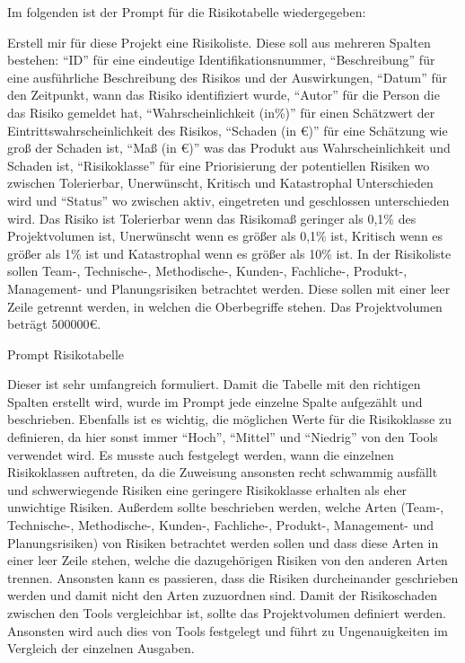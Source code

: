Im folgenden ist der Prompt für die Risikotabelle wiedergegeben:

\begin{prompt}[H]
    \begin{tcolorbox}[colback=gray!20, colframe=gray!20, boxrule=0pt, sharp corners] 
        Erstell mir für diese Projekt eine Risikoliste. Diese soll aus mehreren Spalten bestehen: ``ID'' für eine 
        eindeutige Identifikationsnummer, ``Beschreibung'' für eine ausführliche Beschreibung des Risikos und der 
        Auswirkungen, ``Datum'' für den Zeitpunkt, wann das Risiko identifiziert wurde, ``Autor'' für die Person die 
        das Risiko gemeldet hat, ``Wahrscheinlichkeit (in\%)'' für einen Schätzwert der Eintrittswahrscheinlichkeit 
        des Risikos, ``Schaden (in €)'' für eine Schätzung wie groß der Schaden ist, ``Maß (in €)'' was das Produkt aus 
        Wahrscheinlichkeit und Schaden ist, ``Risikoklasse'' für eine Priorisierung der potentiellen Risiken wo 
        zwischen Tolerierbar, Unerwünscht, Kritisch und Katastrophal Unterschieden wird und ``Status'' wo zwischen 
        aktiv, eingetreten und geschlossen unterschieden wird. Das Risiko ist Tolerierbar wenn das Risikomaß geringer 
        als 0,1\% des Projektvolumen ist, Unerwünscht wenn es größer als 0,1\% ist, Kritisch wenn es größer als 1\% 
        ist und Katastrophal wenn es größer als 10\% ist. In der Risikoliste sollen Team-, Technische-, Methodische-, 
        Kunden-, Fachliche-, Produkt-, Management- und Planungsrisiken betrachtet werden. Diese sollen mit einer 
        leer Zeile getrennt werden, in welchen die Oberbegriffe stehen. Das Projektvolumen beträgt 500000€.
        \vfill
    \end{tcolorbox}
    \caption{Prompt Risikotabelle}
    \label{Prompt Risikotabelle}
\end{prompt}

Dieser ist sehr umfangreich formuliert. Damit die Tabelle mit den richtigen Spalten erstellt wird, wurde im Prompt jede
einzelne Spalte aufgezählt und beschrieben. Ebenfalls ist es wichtig, die möglichen Werte für die Risikoklasse zu 
definieren, da hier sonst immer ``Hoch'', ``Mittel'' und ``Niedrig'' von den Tools verwendet wird. Es musste auch 
festgelegt werden, wann die einzelnen Risikoklassen auftreten, da die Zuweisung ansonsten recht schwammig ausfällt und
schwerwiegende Risiken eine geringere Risikoklasse erhalten als eher unwichtige Risiken. Außerdem sollte beschrieben 
werden, welche Arten (Team-, Technische-, Methodische-, Kunden-, Fachliche-, Produkt-, Management- und Planungsrisiken) 
von Risiken betrachtet werden sollen und dass diese Arten in einer leer Zeile stehen, welche die dazugehörigen Risiken von 
den anderen Arten trennen. Ansonsten kann es passieren, dass die Risiken durcheinander geschrieben werden und damit nicht 
den Arten zuzuordnen sind. Damit der Risikoschaden zwischen den Tools vergleichbar ist, sollte das Projektvolumen definiert 
werden. Ansonsten wird auch dies von Tools festgelegt und führt zu Ungenauigkeiten im Vergleich der einzelnen Ausgaben.

